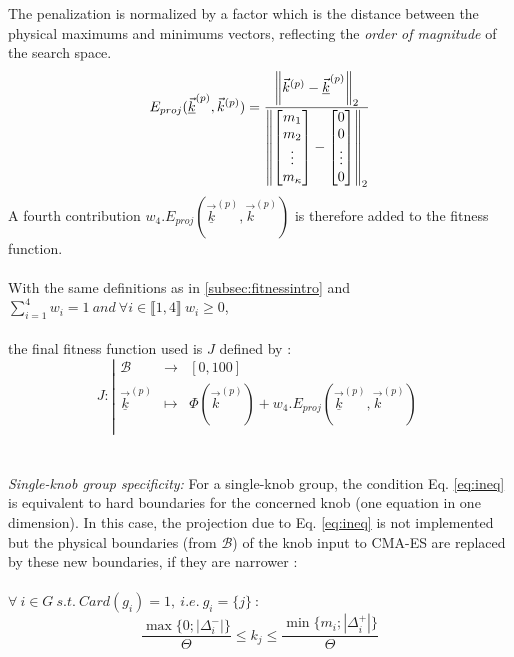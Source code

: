 The penalization is normalized by a factor which is the distance between the physical maximums and minimums vectors, reflecting the \emph{order of magnitude} of the search space.
\begin{equation*}
	E_{proj}(\underline{\vec{k}}^{(p)},\vec{k}^{(p)})=\frac{\left\lVert\vec{k}^{(p)}-\underline{\vec{k}}^{(p)}\right\rVert_{2}}{\left\lVert\begin{bmatrix}m_{1}\\m_{2}\\\vdots\\m_{\kappa}\end{bmatrix}-\begin{bmatrix}0\\0\\\vdots\\0\end{bmatrix}\right\rVert_{2}}
\end{equation*}
A fourth contribution $w_{4}.E_{proj}(\underline{\vec{k}}^{(p)},\vec{k}^{(p)})$ is therefore added to the fitness function.\\
\\
With the same definitions as in \ref{subsec:fitnessintro} and\\
$\sum_{i=1}^{4} w_{i}=1\ and\ \forall i\in\llbracket 1,4\rrbracket\ w_{i}\geq 0$,\\
\\
the final fitness function used is $J$ defined by :\\
\begin{equation*}
		J:
		\left|
  		\begin{array}{rcl}
    	\mathscr{B} & \longrightarrow &[0,100] \\
    	\underline{\vec{k}}^{(p)} & \longmapsto &  \Phi(\vec{k}^{(p)})+w_{4}.E_{proj}(\underline{\vec{k}}^{(p)},\vec{k}^{(p)}) \\
  	\end{array}
	\right.
\end{equation*}
\\
\\
\emph{Single-knob group specificity:} For a single-knob group, the condition Eq. \ref{eq:ineq} is equivalent to hard boundaries for the concerned knob (one equation in one dimension). In this case, the projection due to Eq. \ref{eq:ineq} is not implemented but the physical boundaries (from $\mathscr{B}$) of the knob input to CMA-ES are replaced by these new boundaries, if they are narrower :\\
\\
$\forall\ i\in G\ s.t.\ Card(g_{i})=1,\ i.e.\ g_{i}=\{j\}\ :$
\begin{equation}
	\frac{\max{\big\{0;|\Delta_{i}^{-}|\big\}}}{\Theta}\leq k_{j} \leq \frac{\min{\big\{m_{i};|\Delta_{i}^{+}|\big\}}}{\Theta}
\end{equation}
